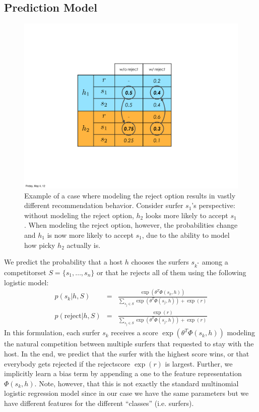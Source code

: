 \subsection{Prediction Model}
\begin{figure}[ht]
\centering
\includegraphics[width=0.6\linewidth]{figures/reject_vs_no_reject.pdf}
\caption{
Example of a case where modeling the reject option results in vastly different recommendation behavior.
Consider surfer $s_1$'s perspective: without modeling the reject option, $h_2$ looks more likely to accept $s_1$.
When modeling the reject option, however, the probabilities change and $h_1$ is now more likely to accept $s_1$, due to the ability to model how picky $h_2$ actually is.}
\label{fig:reject_vs_no_reject}
\end{figure}

We predict the probability that a host $h$ chooses the surfers $s_{k^*}$ among a competitorset $S=\{ s_1, \dots, s_n\}$ or that he rejects all of them using the following logistic model:
\begin{eqnarray}
p(s_k | h, S) &=& \frac{\exp(\theta^T \Phi(s_k,h))}{\sum_{s_j \in S} \exp(\theta^T \Phi(s_j,h)) + \exp(r)} \\
p(\text{reject} | h, S) &=& \frac{\exp(r)}{\sum_{s_j \in S} \exp(\theta^T \Phi(s_j,h)) + \exp(r)}
\end{eqnarray}
In this formulation, each surfer $s_k$ receives a score $\exp(\theta^T \Phi(s_k,h))$ modeling the natural competition between multiple surfers that requested to stay with the host. In the end, we predict that the surfer with the highest score wins, or that everybody gets rejected if the rejectscore $\exp{(r)}$ is largest. 
Further, we implicitly learn a bias term by appending a one to the feature representation $\Phi(s_k,h)$.
Note, however, that this is not exactly the standard multinomial logistic regression model since in our case we have the same parameters but we have different features for the different ``classes'' (i.e. surfers).

